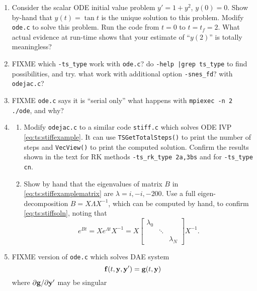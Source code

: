 \renewcommand{\labelenumi}{\arabic{chapter}.\arabic{enumi}\quad}
\renewcommand{\labelenumii}{(\alph{enumii})}
\begin{enumerate}
\item \label{exer:ts:tan}  Consider the scalar ODE initial value problem $y'=1+y^2$, $y(0)=0$.  Show by-hand that $y(t)=\tan t$ is the unique solution to this problem.  Modify \texttt{ode.c} to solve this problem.  Run the code from $t=0$ to $t=t_f=2$.  What actual evidence at run-time shows that your estimate of ``$y(2)$'' is totally meaningless?

\item \label{exer:ts:odepossible} FIXME which \texttt{-ts\_type} work with \texttt{ode.c}?  do \texttt{-help |grep ts\_type} to find possibilities, and try.  what work with additional option \texttt{-snes\_fd}?  with \texttt{odejac.c}?

\item \label{exer:ts:odeserial} FIXME \texttt{ode.c} says it is ``serial only''  what happens with \texttt{mpiexec -n 2 ./ode}, and why?

\item \label{exer:ts:stiffexample}
  \begin{enumerate}
  \item Modify \texttt{odejac.c} to a similar code \texttt{stiff.c} which solves ODE IVP \eqref{eq:ts:stiffexample}.  It can use \texttt{TSGetTotalSteps()} to print the number of steps and \texttt{VecView()} to print the computed solution.  Confirm the results shown in the text for RK methods \texttt{-ts\_rk\_type 2a,3bs} and for \texttt{-ts\_type cn}.
  \item Show by hand that the eigenvalues of matrix $B$ in \eqref{eq:ts:stiffexamplematrix} are $\lambda=i,-i,-200$.  Use a full eigen-decomposition $B = X \Lambda X^{-1}$, which can be computed by hand, to confirm \eqref{eq:ts:stiffsoln}, noting that
    $$e^{Bt} = X e^{\Lambda t} X^{-1} = X \begin{bmatrix} \lambda_0 &  &  \\
                       & \ddots &  \\
                       & & \lambda_N \end{bmatrix} X^{-1}.$$
  \end{enumerate}

\item FIXME version of \texttt{ode.c} which solves DAE system
    $$\mathbf{f}(t,\mathbf{y},\mathbf{y}') = \mathbf{g}(t,\mathbf{y})$$
where $\partial \mathbf{g}/\partial \mathbf{y}'$ may be singular


\end{enumerate}
